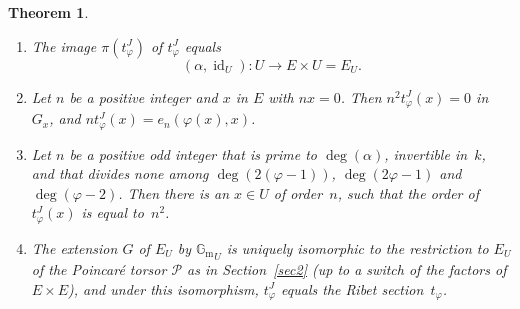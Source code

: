 \documentclass[JEP,XML,SOM,Unicode,NoFloatCountersInSection]{cedram}
\let\mathcal\mathscr
\theoremstyle{plain}
\newtheorem{Theorem}[subsection]{Theorem}
\theoremstyle{definition}
\numberwithin{equation}{subsection}
\let\phi\varphi
\renewcommand{\G}{\mathbb G}
\newcommand{\calP}{\mathcal{P}}
\newcommand{\Gm}{\G_{\mathrm{m}}}
\DeclareMathOperator{\id}{id}
\begin{document}
\skpt
\begin{Theorem}\label{thm:tJ}
\begin{enumerate}
\item\label{thm:tJ1} The image $\pi(t^J_\phi)$ of $t^J_\phi$ equals
\[
(\alpha,\id_U)\colon U\to E\times U = E_U.
\]
\item\label{thm:tJ2} Let $n$ be a positive integer and $x$ in $E$ with $nx=0$.
Then $n^2t^J_\phi(x)=0$ in~$G_x$, and $nt^J_\phi(x) = e_n(\phi(x),x)$.
\item\label{thm:tJ3} Let $n$ be a positive odd integer that is prime to
$\deg(\alpha)$, invertible in~$k$, and that divides none among
$\deg(2(\phi-1))$, $\deg(2\phi-1)$ and $\deg(\phi-2)$. Then there is
an $x\in U$ of order~$n$, such that the order of $t^J_\phi(x)$ is
equal to~$n^2$.
\item\label{thm:tJ4} The extension $G$ of $E_U$ by ${\Gm}_U$ is uniquely isomorphic
to the restriction to $E_U$ of the Poincaré torsor $\calP$ as in
Section~\ref{sec2} (up to a switch of the factors of $E \times E$),
and under this isomorphism, $t^J_\phi$ equals the Ribet
section~$t_\phi$.
\end{enumerate}
\end{Theorem}
\end{document}
